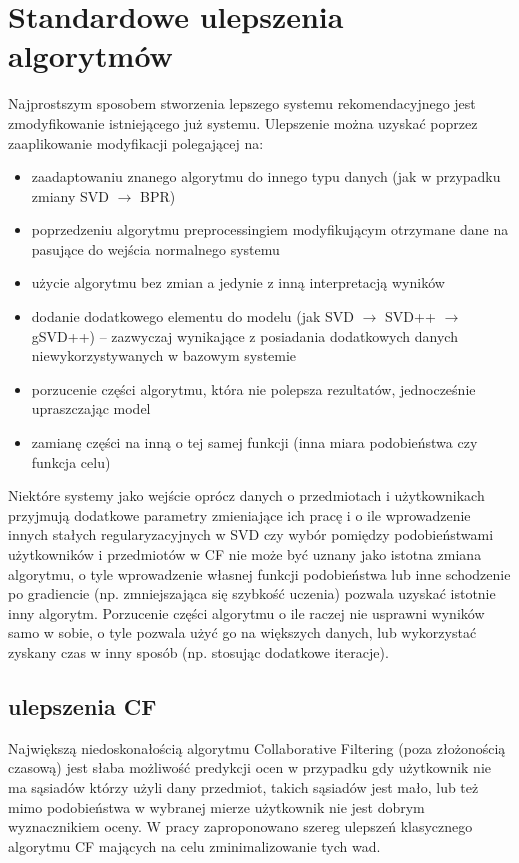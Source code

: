 \documentclass{pracamgr}
\begin{document}
  \section{Standardowe ulepszenia algorytmów}
   Najprostszym sposobem stworzenia lepszego systemu rekomendacyjnego jest zmodyfikowanie istniejącego już systemu.\newline
   Ulepszenie można uzyskać poprzez zaaplikowanie modyfikacji polegającej na:
   \begin{itemize}\itemsep1pt \parskip0pt 
    \item zaadaptowaniu znanego algorytmu do innego typu danych (jak w przypadku zmiany SVD $\rightarrow$ BPR)
    \item poprzedzeniu algorytmu preprocessingiem modyfikującym otrzymane dane na pasujące do wejścia normalnego systemu
    \item użycie algorytmu bez zmian a jedynie z inną interpretacją wyników
    \item dodanie dodatkowego elementu do modelu (jak SVD $\rightarrow$ SVD++ $\rightarrow$ gSVD++)
          -- zazwyczaj wynikające z posiadania dodatkowych danych niewykorzystywanych w bazowym systemie
    \item porzucenie części algorytmu, która nie polepsza rezultatów, jednocześnie upraszczając model
    \item zamianę części na inną o tej samej funkcji (inna miara podobieństwa czy funkcja celu)
   \end{itemize}
   Niektóre systemy jako wejście oprócz danych o przedmiotach i użytkownikach przyjmują dodatkowe parametry zmieniające ich pracę i o ile
   wprowadzenie innych stałych regularyzacyjnych w SVD czy wybór pomiędzy podobieństwami użytkowników i przedmiotów w CF nie może być uznany jako
   istotna zmiana algorytmu, o tyle wprowadzenie własnej funkcji podobieństwa lub inne schodzenie po gradiencie (np. zmniejszająca się szybkość uczenia)
   pozwala uzyskać istotnie inny algorytm.\newline
   Porzucenie części algorytmu o ile raczej nie usprawni wyników samo w sobie, o tyle pozwala użyć go na większych danych,
   lub wykorzystać zyskany czas w inny sposób (np. stosując dodatkowe iteracje).
   \subsection{ulepszenia CF}
    Największą niedoskonałością algorytmu Collaborative Filtering (poza złożonością czasową) jest słaba możliwość predykcji ocen w przypadku gdy użytkownik nie
    ma sąsiadów którzy użyli dany przedmiot, takich sąsiadów jest mało,
    lub też mimo podobieństwa w wybranej mierze użytkownik nie jest dobrym wyznacznikiem oceny.\newline
    W pracy \cite{221} zaproponowano szereg ulepszeń klasycznego algorytmu CF mających na celu zminimalizowanie tych wad.
\end{document}
